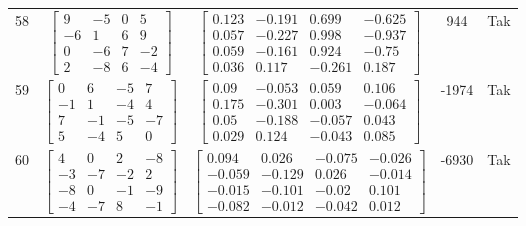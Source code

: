 \documentclass[a4paper,12pt]{article}
\begin{document}
\begin{tabular}{c c c c c}
58
&
$\begin{bmatrix} 9 & -5 & 0 & 5 \\ -6 & 1 & 6 & 9 \\ 0 & -6 & 7 & -2 \\ 2 & -8 & 6 & -4 \end{bmatrix}$
&
$\begin{bmatrix} 0.123 & -0.191 & 0.699 & -0.625 \\ 0.057 & -0.227 & 0.998 & -0.937 \\ 0.059 & -0.161 & 0.924 & -0.75 \\ 0.036 & 0.117 & -0.261 & 0.187 \end{bmatrix}$
&
944
&
Tak
\\
59
&
$\begin{bmatrix} 0 & 6 & -5 & 7 \\ -1 & 1 & -4 & 4 \\ 7 & -1 & -5 & -7 \\ 5 & -4 & 5 & 0 \end{bmatrix}$
&
$\begin{bmatrix} 0.09 & -0.053 & 0.059 & 0.106 \\ 0.175 & -0.301 & 0.003 & -0.064 \\ 0.05 & -0.188 & -0.057 & 0.043 \\ 0.029 & 0.124 & -0.043 & 0.085 \end{bmatrix}$
&
-1974
&
Tak
\\
60
&
$\begin{bmatrix} 4 & 0 & 2 & -8 \\ -3 & -7 & -2 & 2 \\ -8 & 0 & -1 & -9 \\ -4 & -7 & 8 & -1 \end{bmatrix}$
&
$\begin{bmatrix} 0.094 & 0.026 & -0.075 & -0.026 \\ -0.059 & -0.129 & 0.026 & -0.014 \\ -0.015 & -0.101 & -0.02 & 0.101 \\ -0.082 & -0.012 & -0.042 & 0.012 \end{bmatrix}$
&
-6930
&
Tak
\\
\end{tabular} \egroup \newpage
\end{document}
